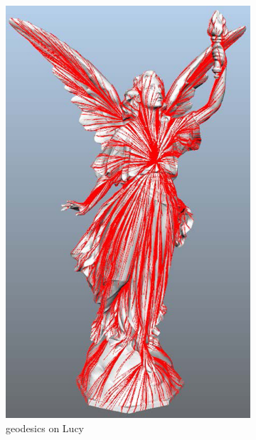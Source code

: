 \begin{figure}
		\ContinuedFloat
        \centering

        \begin{subfigure}[b]{0.5\textwidth}
                \includegraphics[width=\textwidth]{../images/geodesic_image/lucy_allpath-1}
                \caption{geodesics on Lucy}
                \label{fig:lucy}
        \end{subfigure}%
        ~
        \begin{subfigure}[b]{0.5\textwidth}

\end{subfigure}
\end{figure}
